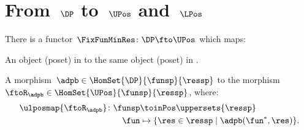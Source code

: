 \section{From~$\DP$ to~$\UPos$ and~$\LPos$}
\begin{lemma}
    \label{lem:covfunctor}
    There is a functor~$\FixFunMinRes\colon \DP \fto \UPos$ which maps:
    \begin{compactenum}
        \item An object (poset) in \DP to the same object (poset) in \UPos.
        \item A morphism~$\adpb\in \HomSet{\DP}{\funsp}{\ressp}$ to the morphism~$\ftoR_{\adpb}\in \HomSet{\UPos}{\funsp}{\ressp}$, where:
        \begin{equation}
            \begin{aligned}
                \ulposmap{\ftoR_{\adpb}}\colon \funsp &\toinPos \uppersets{\ressp}\\
                \fun&\mapsto \{\res \in \ressp\mid \adpb(\fun^*,\res)\}.
            \end{aligned}
        \end{equation}
    \end{compactenum}
\end{lemma}

